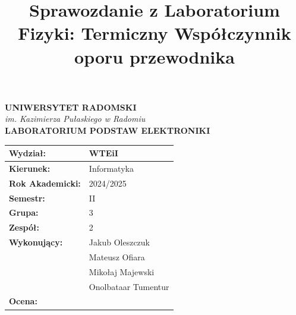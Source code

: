 \documentclass[11pt]{article}
\title{Sprawozdanie z Laboratorium Fizyki: Termiczny Współczynnik oporu przewodnika}
\date{}
\begin{document}
\thispagestyle{empty} %

\begin{center}
    {\Large\textbf{UNIWERSYTET RADOMSKI}} \\
    \textit{im. Kazimierza Pułaskiego w Radomiu} \\
    \vspace{0.3cm}
    {\large\textbf{LABORATORIUM PODSTAW ELEKTRONIKI}} \\
\end{center}

\vspace{1.5cm}

\begin{center}
\end{center}

\vspace{1.5cm}

\begin{center}
\begin{tabular}{|>{\bfseries}p{4cm}|p{6cm}|}
\hline
Wydział: & WTEiI \\
\hline
Kierunek: & Informatyka \\
\hline
Rok Akademicki: & 2024/2025 \\
\hline
Semestr: & II \\
\hline
Grupa: & 3 \\
\hline
Zespół: & 2 \\
\hline
Wykonujący: & Jakub Oleszczuk \\
& Mateusz Ofiara \\
& Mikołaj Majewski \\
& Onolbataar Tumentur \\
\hline
Ocena: &  \\
\hline
\end{tabular}
\end{center}

\vspace{2cm}
\end{document}
